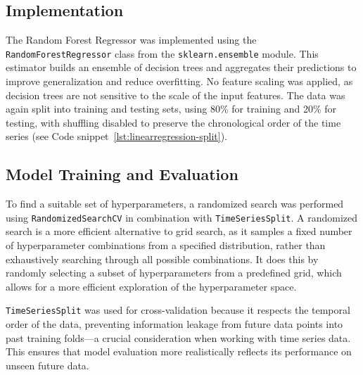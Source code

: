 \subsection{Implementation}
The Random Forest Regressor was implemented using the \texttt{RandomForestRegressor} class from the \texttt{sklearn.ensemble} module. 
This estimator builds an ensemble of decision trees and aggregates their predictions to improve generalization and reduce overfitting.
No feature scaling was applied, as decision trees are not sensitive to the scale of the input features. 
The data was again split into training and testing sets, using 80\% for training and 20\% for testing, with shuffling disabled to preserve the chronological order of the time series (see Code snippet~\ref{lst:linearregression-split}).

\subsection{Model Training and Evaluation}
To find a suitable set of hyperparameters, a randomized search was performed using \texttt{RandomizedSearchCV} in combination with \texttt{TimeSeriesSplit}. A randomized search is a more efficient alternative to grid search, as it samples a fixed number of hyperparameter combinations from a specified distribution, rather than exhaustively searching through all possible combinations.
It does this by randomly selecting a subset of hyperparameters from a predefined grid, which allows for a more efficient exploration of the hyperparameter space.

\texttt{TimeSeriesSplit} was used for cross-validation because it respects the temporal order of the data, preventing information leakage from future data points into past training folds—a crucial consideration when working with time series data. 
This ensures that model evaluation more realistically reflects its performance on unseen future data.


